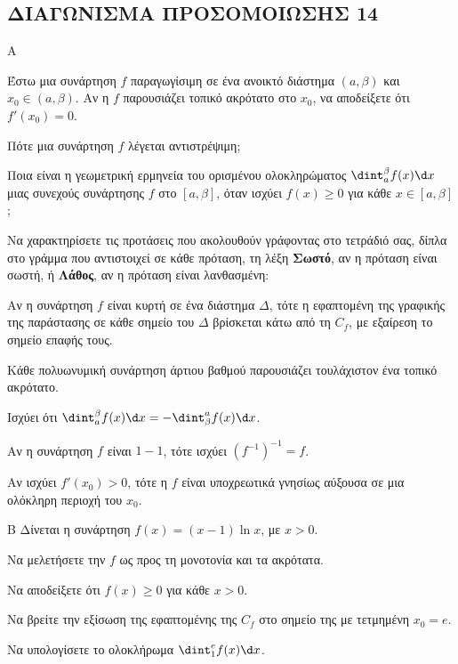 \newpage
\subsection{ΔΙΑΓΩΝΙΣΜΑ ΠΡΟΣΟΜΟΙΩΣΗΣ 14}
\begin{thema}{Α}
\begin{erwthma}
    \item Έστω μια συνάρτηση $f$ παραγωγίσιμη σε ένα ανοικτό διάστημα $(a,\beta)$ και $x_0 \in (a,\beta)$. Αν η $f$ παρουσιάζει τοπικό ακρότατο στο $x_0$, να αποδείξετε ότι $f'(x_0)=0$. 
    \item Πότε μια συνάρτηση $f$ λέγεται αντιστρέψιμη; 
    \item Ποια είναι η γεωμετρική ερμηνεία του ορισμένου ολοκληρώματος $\dint_a^\beta f(x)\d x$ μιας συνεχούς συνάρτησης $f$ στο $[a,\beta]$, όταν ισχύει $f(x)\geq 0$ για κάθε $x \in [a,\beta]$; 
    \item Να χαρακτηρίσετε τις προτάσεις που ακολουθούν γράφοντας στο τετράδιό σας, δίπλα στο γράμμα που αντιστοιχεί σε κάθε πρόταση, τη λέξη \textbf{Σωστό},
αν η πρόταση είναι σωστή, ή \textbf{Λάθος}, αν η πρόταση είναι λανθασμένη:
    \begin{alist}
        \item Αν η συνάρτηση $f$ είναι κυρτή σε ένα διάστημα $\Delta$, τότε η εφαπτομένη της γραφικής της παράστασης σε κάθε σημείο του $\Delta$ βρίσκεται κάτω από τη $C_f$, με εξαίρεση το σημείο επαφής τους.
        \item Κάθε πολυωνυμική συνάρτηση άρτιου βαθμού παρουσιάζει τουλάχιστον ένα τοπικό ακρότατο.
        \item Ισχύει ότι $\dint_a^\beta f(x)\d x = -\dint_\beta^a f(x)\d x$.
        \item Αν η συνάρτηση $f$ είναι $1-1$, τότε ισχύει $(f^{-1})^{-1} = f$.
        \item Αν ισχύει $f'(x_0)>0$, τότε η $f$ είναι υποχρεωτικά γνησίως αύξουσα σε μια ολόκληρη περιοχή του $x_0$.
    \end{alist} 
\end{erwthma}
\end{thema}

\begin{thema}{Β}
Δίνεται η συνάρτηση $f(x) = (x-1)\ln x$, με $x>0$.
\begin{erwthma}
    \item Να μελετήσετε την $f$ ως προς τη μονοτονία και τα ακρότατα. 
    \item Να αποδείξετε ότι $f(x)\geq 0$ για κάθε $x > 0$. 
    \item Να βρείτε την εξίσωση της εφαπτομένης της $C_f$ στο σημείο της με τετμημένη $x_0=e$. 
    \item Να υπολογίσετε το ολοκλήρωμα $\dint_1^e f(x)\d x$. 
\end{erwthma}
\end{thema}

